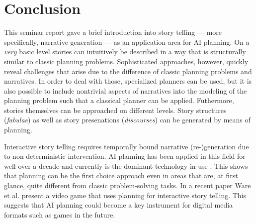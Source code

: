 \section{Conclusion}\label{conclusion}
This seminar report gave a brief introduction into story telling --- more specifically, narrative generation --- as an application area for AI planning. On a \emph{very} basic level stories can intuitively be described in a way that is structurally similar to classic planning problems. Sophisticated approaches, however, quickly reveal challenges that arise due to the difference of classic planning problems and narratives. In order to deal with those, specialized planners can be used, but it is also possible to include nontrivial aspects of narratives into the modeling of the planning problem such that a classical planner can be applied. Futhermore, stories themselves can be approached on different levels. Story structures (\emph{fabulae}) as well as story presenations (\emph{discourses}) can be generated by means of planning.

Interactive story telling requires temporally bound narrative \mbox{(re-)}generation due to non deterministic intervention. AI planning has been applied in this field for well over a decade and currently is the dominant technology in use \cite{Porteous10}. This shows that planning can be the first choice approach even in areas that are, at first glance, quite different from classic problem-solving tasks. In a recent paper Ware et al. \cite{Ware15} present a video game that uses planning for interactive story telling. This suggests that AI planning could become a key instrument for digital media formats such as games in the future.%

